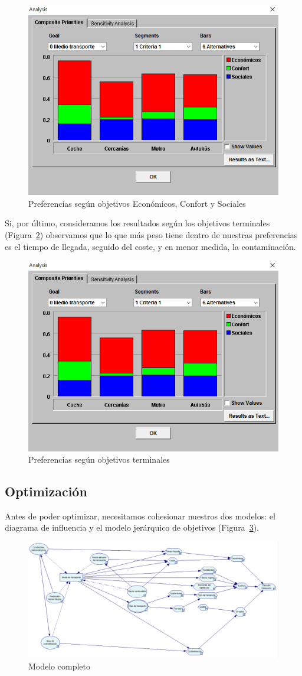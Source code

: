\documentclass[12pt,a4paper,twoside,openright,titlepage,final]{article}
\begin{document}
\begin{figure}[htbp!]
\centering
\includegraphics[width=0.5\linewidth]{imagenes/analisis_1}
\caption{Preferencias según objetivos Económicos, Confort y Sociales} \label{fig:analisis_1}
\end{figure}

Si, por último, consideramos los resultados según los objetivos terminales (Figura~\ref{fig:analisis_2}) observamos que lo que más peso tiene dentro de nuestras preferencias es el tiempo de llegada, seguido del coste, y en menor medida, la contaminación.\\

\begin{figure}[htbp!]
\centering
\includegraphics[width=0.5\linewidth]{imagenes/analisis_1}
\caption{Preferencias según objetivos terminales} \label{fig:analisis_2}
\end{figure}

\subsection{Optimización}

Antes de poder optimizar, necesitamos cohesionar nuestros dos modelos: el diagrama de influencia y el modelo jerárquico de objetivos (Figura~\ref{fig:diagrama_influencia_completo}).\\

\begin{figure}[htbp!]
\centering
\includegraphics[width=\linewidth]{imagenes/diagrama_influencia_completo}
\caption{Modelo completo} \label{fig:diagrama_influencia_completo}
\end{figure}
\end{document}
